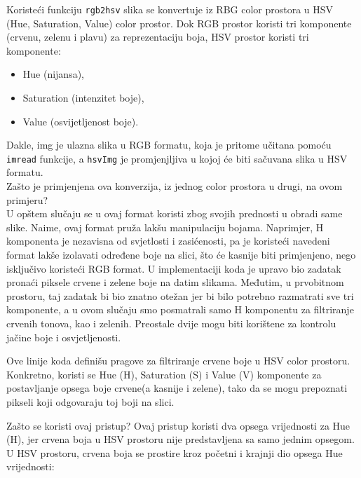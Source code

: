 \documentclass[a4paper,12pt]{article}
\begin{document}
Koristeći funkciju \texttt{rgb2hsv} slika se konvertuje iz RBG color prostora u HSV (Hue, Saturation, Value) color prostor. 
Dok RGB prostor koristi tri komponente (crvenu, zelenu i plavu) za reprezentaciju boja, HSV prostor koristi tri komponente:\\
\begin{itemize}
    \item Hue (nijansa),
    \item Saturation (intenzitet boje),
    \item Value (osvijetljenost boje).
\end{itemize}

Dakle, img je ulazna slika u RGB formatu, koja je pritome učitana pomoću \texttt {imread} funkcije, a \texttt{hsvImg} je promjenjljiva u kojoj će biti sačuvana slika u HSV formatu. \\

\indent Zašto je primjenjena ova konverzija, iz jednog color prostora u drugi, na ovom primjeru?\\

U opštem slučaju se u ovaj format koristi zbog svojih prednosti u obradi same slike. 
Naime, ovaj format pruža lakšu manipulaciju bojama. 
Naprimjer, H komponenta je nezavisna od svjetlosti i zasićenosti, pa je koristeći navedeni format lakše izolavati određene boje na slici, što će kasnije biti primjenjeno, nego isključivo koristeći RGB format. 
U implementaciji koda je upravo bio zadatak pronaći piksele crvene i zelene boje na datim slikama. 
Međutim, u prvobitnom prostoru, taj zadatak bi bio znatno otežan jer bi bilo potrebno razmatrati sve tri komponente, a u ovom slučaju smo posmatrali samo H komponentu za filtriranje crvenih tonova, kao i zelenih. 
Preostale dvije mogu biti korištene za kontrolu jačine boje i osvjetljenosti. 



Ove linije koda definišu pragove za filtriranje crvene boje u HSV color prostoru. 
Konkretno, koristi se Hue (H), Saturation (S) i Value (V) komponente za postavljanje opsega boje crvene(a kasnije i zelene), tako da se mogu prepoznati pikseli koji odgovaraju toj boji na slici.

Zašto se koristi ovaj pristup?
Ovaj pristup koristi dva opsega vrijednosti za Hue (H), jer crvena boja u HSV prostoru nije predstavljena sa samo jednim opsegom. 
U HSV prostoru, crvena boja se prostire kroz početni i krajnji dio opsega Hue vrijednosti:
\end{document}
